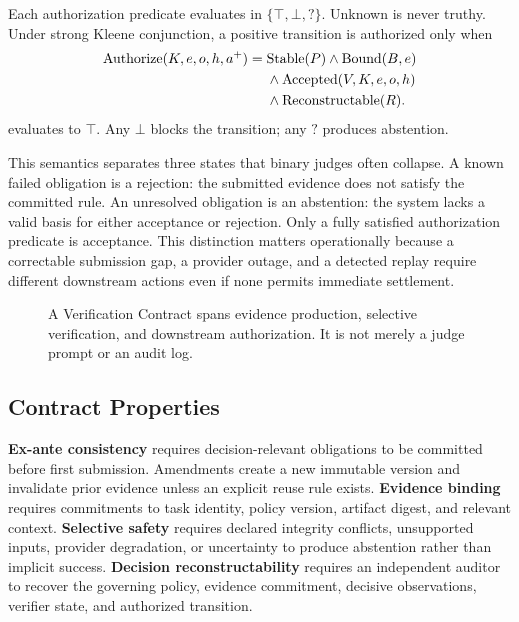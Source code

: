 \documentclass[sigconf,anonymous,review]{acmart}
\begin{document}
Each authorization predicate evaluates in $\{\top,\bot,?\}$. Unknown is never truthy. Under strong Kleene conjunction, a positive transition is authorized only when
\begin{align}
\mathrm{Authorize}(K,e,o,h,a^+) ={}& \mathrm{Stable}(P)\land \mathrm{Bound}(B,e) \notag\\
&\land \mathrm{Accepted}(V,K,e,o,h) \notag\\
&\land \mathrm{Reconstructable}(R).
\end{align}
evaluates to $\top$. Any $\bot$ blocks the transition; any $? $ produces abstention.

This semantics separates three states that binary judges often collapse. A known failed obligation is a rejection: the submitted evidence does not satisfy the committed rule. An unresolved obligation is an abstention: the system lacks a valid basis for either acceptance or rejection. Only a fully satisfied authorization predicate is acceptance. This distinction matters operationally because a correctable submission gap, a provider outage, and a detected replay require different downstream actions even if none permits immediate settlement.

\begin{figure}[t]
\centering

\caption{A Verification Contract spans evidence production, selective verification, and downstream authorization. It is not merely a judge prompt or an audit log.}
\label{fig:architecture}
\end{figure}

\subsection{Contract Properties}
\textbf{Ex-ante consistency} requires decision-relevant obligations to be committed before first submission. Amendments create a new immutable version and invalidate prior evidence unless an explicit reuse rule exists. \textbf{Evidence binding} requires commitments to task identity, policy version, artifact digest, and relevant context. \textbf{Selective safety} requires declared integrity conflicts, unsupported inputs, provider degradation, or uncertainty to produce abstention rather than implicit success. \textbf{Decision reconstructability} requires an independent auditor to recover the governing policy, evidence commitment, decisive observations, verifier state, and authorized transition.
\end{document}
